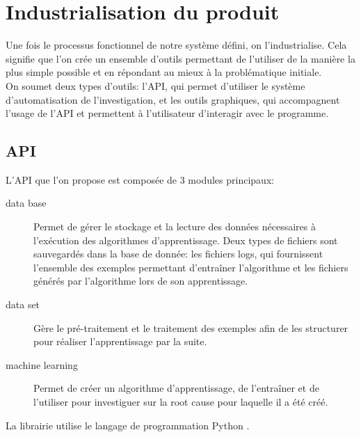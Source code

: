 \chapter{Industrialisation du produit}
\label{Industrialisation du produit}
\thispagestyle{fancy}
Une fois le processus fonctionnel de notre système défini, on l'industrialise. Cela signifie que l'on crée un ensemble d'outils permettant de l'utiliser de la manière la plus simple possible et en répondant au mieux à la problématique initiale. \\
On soumet deux types d'outils: l'API, qui permet d'utiliser le système d'automatisation de l'investigation, et les outils graphiques, qui accompagnent l'usage de l'API et permettent à l'utilisateur d'interagir avec le programme.  

\section{API}
\label{Industrialisation du produit: API}
L'API que l'on propose est composée de 3 modules principaux:
\begin{description}
	\item [data base] Permet de gérer le stockage et la lecture des données nécessaires à l'exécution des algorithmes d'apprentissage. Deux types de fichiers sont sauvegardés dans la base de donnée: les fichiers logs, qui fournissent l'ensemble des exemples permettant d'entraîner l'algorithme et les fichiers générés par l'algorithme lors de son apprentissage.
	\item [data set] Gère le pré-traitement et le traitement des exemples afin de les structurer pour réaliser l'apprentissage par la suite.
	\item [machine learning] Permet de créer un algorithme d'apprentissage, de l'entraîner et de l'utiliser pour investiguer sur la root cause pour laquelle il a été créé.
\end{description}

La librairie utilise le langage de programmation Python \cite{Python}. \\

